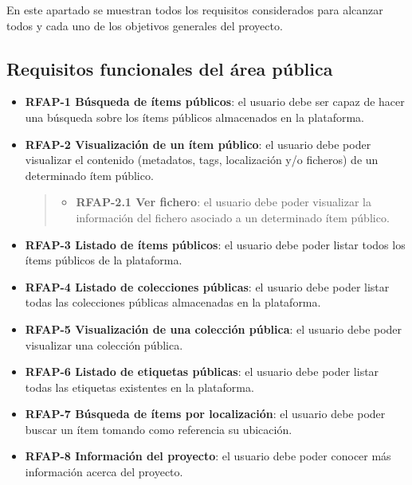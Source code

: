 \documentclass[
]{article}
\providecommand{\tightlist}{%
  \setlength{\itemsep}{0pt}\setlength{\parskip}{0pt}}
\begin{document}
En este apartado se muestran todos los requisitos considerados para
alcanzar todos y cada uno de los objetivos generales del proyecto.

\hypertarget{requisitos-funcionales-del-uxe1rea-puxfablica}{%
\subsection{Requisitos funcionales del área
pública}\label{requisitos-funcionales-del-uxe1rea-puxfablica}}

\begin{itemize}
\item
  \textbf{RFAP-1 Búsqueda de ítems públicos}: el usuario debe ser capaz
  de hacer una búsqueda sobre los ítems públicos almacenados en la
  plataforma.
\item
  \textbf{RFAP-2 Visualización de un ítem público}: el usuario debe
  poder visualizar el contenido (metadatos, tags, localización y/o
  ficheros) de un determinado ítem público.

  \begin{quote}
  \begin{itemize}
  \tightlist
  \item
    \textbf{RFAP-2.1 Ver fichero}: el usuario debe poder visualizar la
    información del fichero asociado a un determinado ítem público.
  \end{itemize}
  \end{quote}
\item
  \textbf{RFAP-3 Listado de ítems públicos}: el usuario debe poder
  listar todos los ítems públicos de la plataforma.
\item
  \textbf{RFAP-4 Listado de colecciones públicas}: el usuario debe poder
  listar todas las colecciones públicas almacenadas en la plataforma.
\item
  \textbf{RFAP-5 Visualización de una colección pública}: el usuario
  debe poder visualizar una colección pública.
\item
  \textbf{RFAP-6 Listado de etiquetas públicas}: el usuario debe poder
  listar todas las etiquetas existentes en la plataforma.
\item
  \textbf{RFAP-7 Búsqueda de ítems por localización}: el usuario debe
  poder buscar un ítem tomando como referencia su ubicación.
\item
  \textbf{RFAP-8 Información del proyecto}: el usuario debe poder
  conocer más información acerca del proyecto.
\end{itemize}
\end{document}
